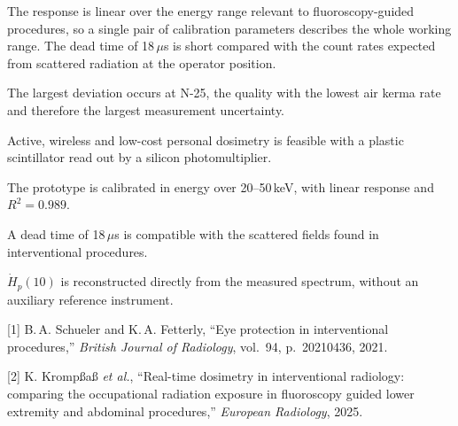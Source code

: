 The response is linear over the energy range relevant to fluoroscopy-guided
procedures, so a single pair of calibration parameters describes the whole
working range. The dead time of 18\,$\mu$s is short compared with the count
rates expected from scattered radiation at the operator position.

The largest deviation occurs at N-25, the quality with the lowest air kerma
rate and therefore the largest measurement uncertainty.


\begin{dorilist}
  \item Active, wireless and low-cost personal dosimetry is feasible with a
        plastic scintillator read out by a silicon photomultiplier.
  \item The prototype is calibrated in energy over 20--50\,keV, with linear
        response and $R^2 = 0.989$.
  \item A dead time of 18\,$\mu$s is compatible with the scattered fields
        found in interventional procedures.
  \item $\dot{H}_p(10)$ is reconstructed directly from the measured spectrum,
        without an auxiliary reference instrument.
\end{dorilist}


[1] B.\,A. Schueler and K.\,A. Fetterly, ``Eye protection in interventional
procedures,'' \emph{British Journal of Radiology}, vol.~94, p.~20210436, 2021.

[2] K. Kromp\ss{}a\ss{} \emph{et al.}, ``Real-time dosimetry in interventional
radiology: comparing the occupational radiation exposure in fluoroscopy guided
lower extremity and abdominal procedures,'' \emph{European Radiology}, 2025.
